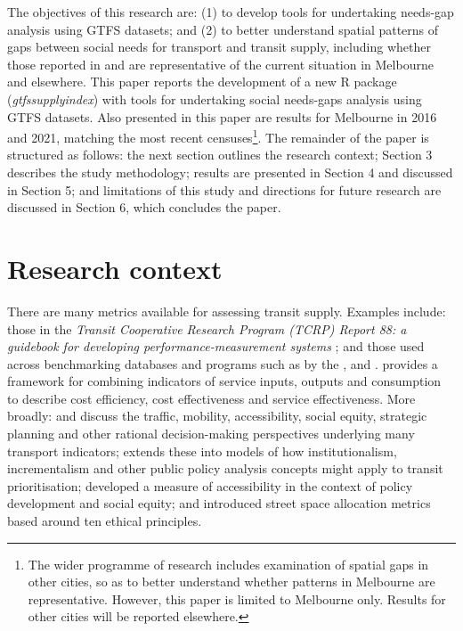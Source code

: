 \documentclass[preprint, 3p,
authoryear]{elsarticle} %
\begin{document}
The objectives of this research are: (1) to develop tools for
undertaking needs-gap analysis using GTFS datasets; and (2) to better
understand spatial patterns of gaps between social needs for transport
and transit supply, including whether those reported in
\citet{Currie2007Identifying} and \citet{currie2010identifying} are
representative of the current situation in Melbourne and elsewhere. This
paper reports the development of a new R package
(\emph{gtfssupplyindex}) with tools for undertaking social needs-gaps
analysis using GTFS datasets. Also presented in this paper are results
for Melbourne in 2016 and 2021, matching the most recent
censuses\footnote{The wider programme of research includes examination
  of spatial gaps in other cities, so as to better understand whether
  patterns in Melbourne are representative. However, this paper is
  limited to Melbourne only. Results for other cities will be reported
  elsewhere.}. The remainder of the paper is structured as follows: the
next section outlines the research context; Section 3 describes the
study methodology; results are presented in Section 4 and discussed in
Section 5; and limitations of this study and directions for future
research are discussed in Section 6, which concludes the paper.

\section{Research context}\label{research-context}

There are many metrics available for assessing transit supply. Examples
include: those in the \emph{Transit Cooperative Research Program (TCRP)
Report 88: a guidebook for developing performance-measurement systems}
\citep{Ryus:2003aa}; and those used across benchmarking databases and
programs such as by the
\citet{Florida-Transit-Information-System:2018aa}, \citet{UITP:2015aa}
and \citet{Imperial-College-London:2023aa}.
\citet{FieldingGordonJ1987Mpts} provides a framework for combining
indicators of service inputs, outputs and consumption to describe cost
efficiency, cost effectiveness and service effectiveness. More broadly:
\citet{Litman:2003ab} and \citet{Litman:2016aa} discuss the traffic,
mobility, accessibility, social equity, strategic planning and other
rational decision-making perspectives underlying many transport
indicators; \citet{Reynolds:2017ah} extends these into models of how
institutionalism, incrementalism and other public policy analysis
concepts might apply to transit prioritisation;
\citet{GuzmanLuisA.2017Aeit} developed a measure of accessibility in the
context of policy development and social equity; and
\citet{Creutzig2020streetspaceallocation} introduced street space
allocation metrics based around ten ethical principles.
\end{document}
